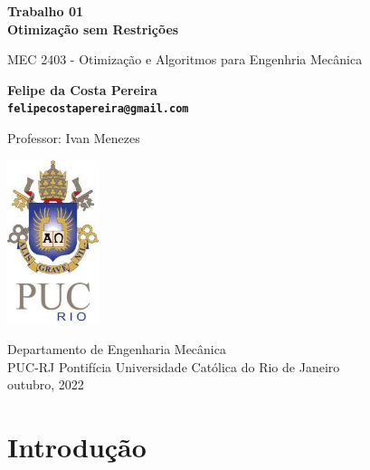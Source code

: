 \documentclass[10pt, a4paper]{article}
\begin{document}
\begin{titlepage}
      \begin{center}
          \vspace*{1cm}

          \Huge
          \textbf{Trabalho 01 \\ Otimiza\c c\~ao  sem Restri\c c\~oes}

          \vspace{0.5cm}
          \LARGE
          MEC 2403 - Otimiza\c c\~ao e Algoritmos para Engenhria Mec\^anica

          \vspace{1.5cm}

          \textbf{Felipe da Costa Pereira \\ {\tt felipecostapereira@gmail.com}}

          \vfill
          Professor: Ivan Menezes

          \vspace{0.8cm}

          \includegraphics[width=0.2\textwidth]{puc.jpg}

          \Large
          Departamento de Engenharia Mec\^anica\\
          PUC-RJ Pontif\'icia Universidade Cat\'olica do Rio de Janeiro\\
          outubro, 2022

      \end{center}
  \end{titlepage}


\section{Introdu\c c\~ao}
\end{document}
